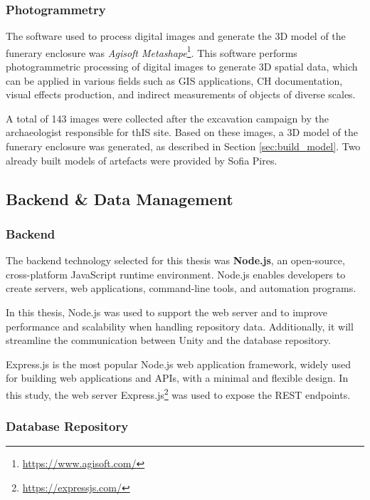\subsubsection{Photogrammetry}
\label{sec:photogrammetry_tool} 

The software used to process digital images and generate the \gls{3D} model of the funerary enclosure was \textit{Agisoft Metashape}\footnote{\url{https://www.agisoft.com/}}.
This software performs photogrammetric processing of digital images to generate \gls{3D} spatial data, which can be applied in various fields such as \gls{GIS} applications, \gls{CH} documentation, visual effects production, and indirect measurements of objects of diverse scales. 

 A total of 143 images were collected after the excavation campaign by the archaeologist responsible for thIS site.
Based on these images, a \gls{3D} model of the funerary enclosure was generated, as described in Section \ref{sec:build_model}.
Two already built models of artefacts were provided by Sofia Pires.

\subsection{Backend \& Data Management}
\subsubsection{Backend}

The backend technology selected for this thesis was \textbf{Node.js}, an open-source, cross-platform JavaScript runtime environment. 
Node.js enables developers to create servers, web applications, command-line tools, and automation programs.

In this thesis, Node.js was used to support the web server and to improve performance and scalability when handling repository data. 
Additionally, it will streamline the communication between Unity and the database repository.

Express.js is the most popular Node.js web application framework, widely used for building web applications and \gls{API}s, with a minimal and flexible design.
In this study, the web server Express.js\footnote{\url{https://expressjs.com/}} was used to expose the REST endpoints.


\subsubsection{Database Repository}
\label{sec:repos}

